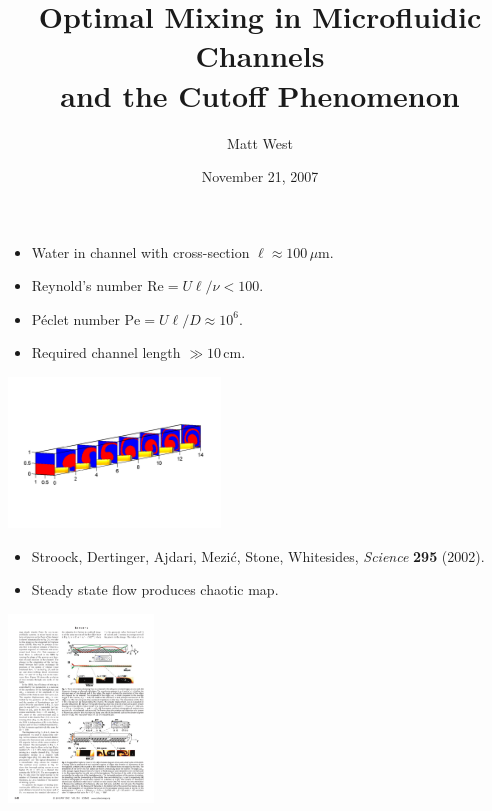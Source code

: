 \documentclass[12pt,t]{beamer}
\begin{document}
\title[Optimal Microfluidic Mixing and Cutoff]{Optimal Mixing in Microfluidic Channels\\ and the Cutoff Phenomenon}
\author{Matt West}
\date{November 21, 2007}
\frame{\titlepage}

\begin{frame}
  \begin{itemize}
  \item Water in channel with cross-section $\ell \approx 100\,\mu\text{m}$.
  \item Reynold's number $\text{Re} = U\ell/\nu < 100$.
  \item P\'eclet number $\text{Pe} = U\ell/D \approx 10^6$.
  \item Required channel length $\gg 10\,\text{cm}$.
  \end{itemize}
  \begin{center}
      \includegraphics[height=4cm,trim=1.5cm 4cm 1.5cm 4.5cm,clip=true]{mixingchannel}
  \end{center}
\end{frame}
\begin{frame}
  \begin{itemize}
  \item Stroock, Dertinger, Ajdari, Mezi\'c, Stone, Whitesides,
    \textit{Science} \textbf{295} (2002).
  \item Steady state flow produces chaotic map.
  \end{itemize}
  \begin{center}
    \includegraphics[height=5cm,trim=8.6cm 6.2cm 2cm 15.2cm,clip=true]{stroock_page2}
  \end{center}
\end{frame}
\end{document}
